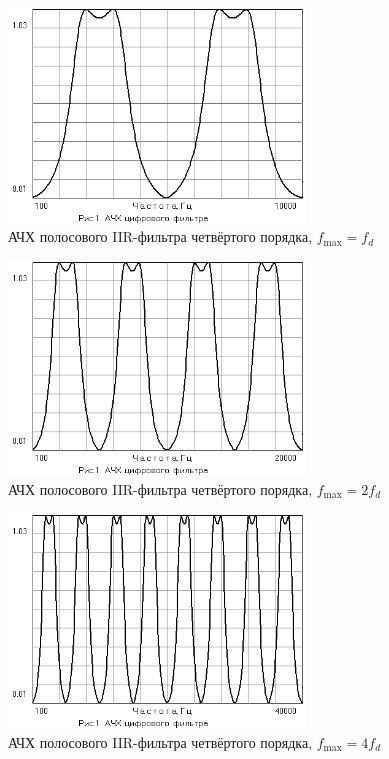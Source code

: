 \begin{figure}[H]
  \centering
  \includegraphics[width=0.7\textwidth]{data/Z1_PPF/gain_IIR4P_FD.png}
  \caption{АЧХ полосового IIR-фильтра четвёртого порядка, $f_{\max}=f_d$}
  \label{fig:}
\end{figure}
\begin{figure}[H]
  \centering
  \includegraphics[width=0.7\textwidth]{data/Z1_PPF/gain_IIR4P_2FD.png}
  \caption{АЧХ полосового IIR-фильтра четвёртого порядка, $f_{\max}=2f_d$}
  \label{fig:}
\end{figure}
\begin{figure}[H]
  \centering
  \includegraphics[width=0.7\textwidth]{data/Z1_PPF/gain_IIR4P_4FD.png}
  \caption{АЧХ полосового IIR-фильтра четвёртого порядка, $f_{\max}=4f_d$}
  \label{fig:}
\end{figure}

